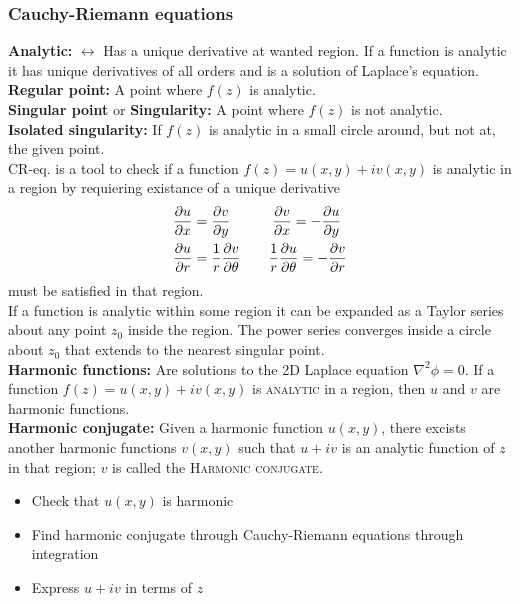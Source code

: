 \documentclass[a4paper, 10pt]{article}
\begin{document}
\begin{multicols*}{3}
\subsubsection*{Cauchy-Riemann equations}
\textbf{Analytic:} $\leftrightarrow$ Has a unique derivative at wanted region. If a function is analytic it has unique derivatives of all orders and is a solution of Laplace's equation.\\
\textbf{Regular point:} A point where $f(z)$ is analytic.\\
\textbf{Singular point} or \textbf{Singularity:} A point where $f(z)$ is not analytic.\\
\textbf{Isolated singularity:} If $f(z)$ is analytic in a small circle around, but not at, the given point.\\
CR-eq. is a tool to check if a function $f(z) = u(x,y) +iv(x,y)$ is analytic in a region by requiering existance of a unique derivative
\begin{align*}
  \pdv{u}{x} &= \pdv{v}{y} \qquad\quad \pdv{v}{x} = - \pdv{u}{y} \\
  \pdv{u}{r} &= \frac{1}{r}\pdv{v}{\theta} \qquad \frac{1}{r}\pdv{u}{\theta} = - \pdv{v}{r}
\end{align*}
must be satisfied in that region.\\
If a function is analytic within some region it can be expanded as a Taylor series about any point $z_0$ inside the region. The power series converges inside a circle about $z_0$ that extends to the nearest singular point.\\
\textbf{Harmonic functions:} Are solutions to the 2D Laplace equation $\nabla^2\phi = 0$. If a function $f(z) = u(x,y) +iv(x,y)$ is \textsc{analytic} in a region, then $u$ and $v$ are harmonic functions.\\
\textbf{Harmonic conjugate:} Given a harmonic function $u(x,y)$, there excists another harmonic functions $v(x,y)$ such that $u+iv$ is an analytic function of $z$ in that region; $v$ is called the \textsc{Harmonic conjugate}.
\begin{itemize}
  \item Check that $u(x,y)$ is harmonic
  \item Find harmonic conjugate through Cauchy-Riemann equations through integration
  \item Express $u+iv$ in terms of $z$
\end{itemize}

\end{multicols*}
\end{document}
